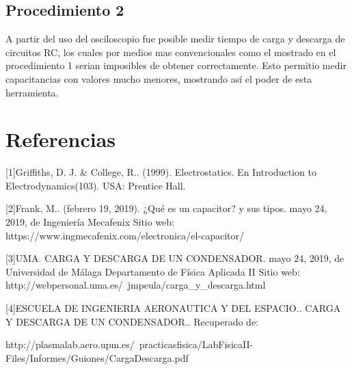 \documentclass[10pt,letter]{article}
\begin{document}
\begin{multicols}{2}
\subsection{Procedimiento 2}
A partir del  uso del osciloscopio fue posible medir tiempo de carga y descarga de circuitos RC, los cuales por medios mas convencionales como el mostrado en el procedimiento 1 serian imposibles de obtener correctamente. Esto  permitio medir capacitancias con valores mucho menores, mostrando así el poder de esta herramienta. 
 
\end{multicols}

\section*{Referencias}
\parindent=0cm

[1]Griffiths, D. J. \& College, R.. (1999). Electrostatics. En Introduction to Electrodynamics(103). USA: Prentice Hall.

\vspace{0.2cm}

[2]Frank, M.. (febrero 19, 2019). ¿Qué es un capacitor? y sus tipos. mayo 24, 2019, de Ingeniería Mecafenix Sitio web: https://www.ingmecafenix.com/electronica/el-capacitor/

\vspace{0.2cm}

[3]UMA. CARGA Y DESCARGA DE UN CONDENSADOR. mayo 24, 2019, de Universidad de Málaga Departamento de Física Aplicada II Sitio web: http://webpersonal.uma.es/~jmpeula/carga\_y\_descarga.html

\vspace{0.2cm}

[4]ESCUELA DE INGENIERIA AERONAUTICA Y DEL ESPACIO.. CARGA Y DESCARGA DE UN CONDENSADOR.. Recuperado de: 

http://plasmalab.aero.upm.es/~practicasfisica/LabFisicaII-Files/Informes/Guiones/CargaDescarga.pdf
\end{document}
